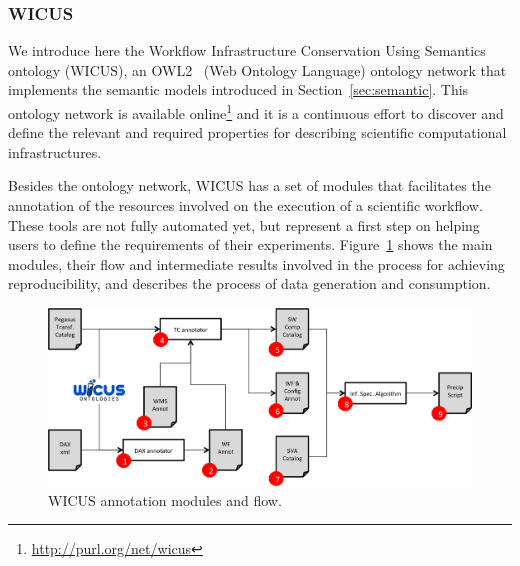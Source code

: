 \subsubsection{WICUS}
We introduce here the Workflow Infrastructure Conservation Using Semantics ontology (WICUS), an OWL2~\cite{OWL2} (Web Ontology Language) ontology network that implements the semantic models introduced in Section~\ref{sec:semantic}. This ontology network is available online\footnote{\url{http://purl.org/net/wicus}} and it is a continuous effort to discover and define the relevant and required properties for describing scientific computational infrastructures. 

Besides the ontology network, WICUS has a set of modules that facilitates the annotation of the resources involved on the execution of a scientific workflow. These tools are not fully automated yet, but represent a first step on helping users to define the requirements of their experiments. Figure~\ref{fig:wicusflow} shows the main modules, their flow and intermediate results involved in the process for achieving reproducibility, and describes the process of data generation and consumption.

\begin{figure}[!htb]
	\centering
	\includegraphics[width=\linewidth]{figures/wicusflow}
	\caption{WICUS annotation modules and flow.}
	\label{fig:wicusflow}
\end{figure}

